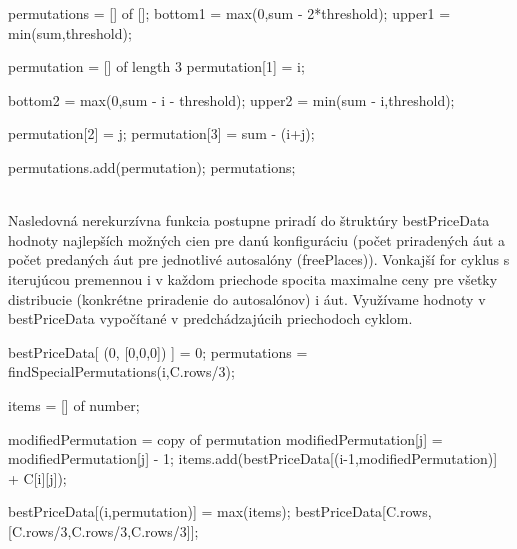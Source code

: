\documentclass[paper=a4, fontsize=11pt]{scrartcl} %
\numberwithin{equation}{section} %
\numberwithin{figure}{section} %
\numberwithin{table}{section} %
\begin{document}
\begin{algorithmic}
		\State \Return [0,0,0]
	\EndIf
	\State permutations = [] of [];
	\State bottom1 = max(0,sum - 2*threshold);
	\State upper1 = min(sum,threshold);
	
		\State permutation = [] of length 3
		\State permutation[1] = i;
		
		\State bottom2 = max(0,sum - i - threshold);
		\State upper2 = min(sum - i,threshold);
		
			\State permutation[2] = j;
			\State permutation[3] = sum - (i+j);
		\EndFor
		
		
		permutations.add(permutation);
	\EndFor
	\State \Return permutations;
\EndFunction
\end{algorithmic}
\ \\
Nasledovná nerekurzívna funkcia postupne priradí do štruktúry bestPriceData hodnoty najlepších možných cien pre danú konfiguráciu (počet priradených áut a počet predaných áut pre jednotlivé autosalóny (freePlaces)).
Vonkajší for cyklus s iterujúcou premennou i v každom priechode spocita maximalne ceny pre všetky distribucie (konkrétne priradenie do autosalónov) i áut.
Využívame hodnoty v bestPriceData vypočítané v predchádzajúcih priechodoch cyklom. \ \\


\begin{algorithmic}[1]
    \State bestPriceData[ (0, [0,0,0]) ] = 0;
        \State permutations = findSpecialPermutations(i,C.rows/3);
	
		
            
            \State items = [] of number;
            
	    	
                \State modifiedPermutation = copy of permutation
		    \State modifiedPermutation[j] = modifiedPermutation[j] - 1;
		    \State items.add(bestPriceData[(i-1,modifiedPermutation)] + C[i][j]);
                 \EndIf
            \EndFor			
		
            \State bestPriceData[(i,permutation)] = max(items);		
        \EndFor
    \EndFor
    \State \Return bestPriceData[C.rows,[C.rows/3,C.rows/3,C.rows/3]];
\EndFunction
\end{algorithmic}
\end{document}

